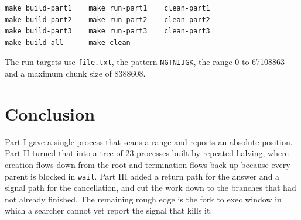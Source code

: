 \documentclass[11pt]{article}
\begin{document}
\begin{verbatim}
make build-part1    make run-part1    clean-part1
make build-part2    make run-part2    clean-part2
make build-part3    make run-part3    clean-part3
make build-all      make clean
\end{verbatim}

The run targets use \texttt{file.txt}, the pattern \texttt{NGTNIJGK}, the range 0 to
67108863 and a maximum chunk size of 8388608.

\section*{Conclusion}
Part I gave a single process that scans a range and reports an absolute position.
Part II turned that into a tree of 23 processes built by repeated halving, where
creation flows down from the root and termination flows back up because every parent
is blocked in \texttt{wait}. Part III added a return path for the answer and a
signal path for the cancellation, and cut the work down to the branches that had not
already finished. The remaining rough edge is the fork to exec window in which a
searcher cannot yet report the signal that kills it.

\newpage
\end{document}
